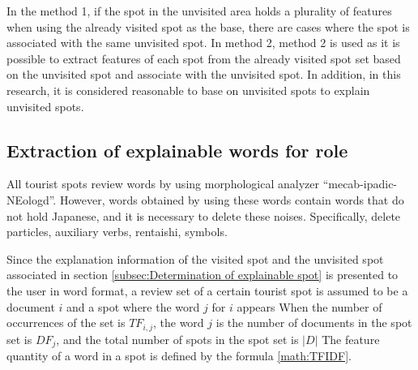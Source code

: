 \documentclass[journal]{IAENGtran}
\begin{document}
In the method 1, if the spot in the unvisited area holds a plurality of features when using the already visited spot as the base, there are cases where the spot is associated with the same unvisited spot.
In method 2, method 2 is used as it is possible to extract features of each spot from the already visited spot set based on the unvisited spot and associate with the unvisited spot.
In addition, in this research, it is considered reasonable to base on unvisited spots to explain unvisited spots.

\subsection{Extraction of explainable words for role}
\label{subsec:Extraction of explainable words for role}
All tourist spots review words by using morphological analyzer ``mecab-ipadic-NEologd''.
However, words obtained by using these words contain words that do not hold Japanese, and it is necessary to delete these noises.
Specifically, delete particles, auxiliary verbs, rentaishi, symbols.

Since the explanation information of the visited spot and the unvisited spot associated in section \ref{subsec:Determination of explainable spot} is presented to the user in word format, a review set of a certain tourist spot is assumed to be a document $i$ and a spot where the word $j$ for $i$ appears When the number of occurrences of the set is $TF_{i,j}$, the word $j$ is the number of documents in the spot set is $DF_{j}$, and the total number of spots in the spot set is $|D|$ The feature quantity of a word in a spot is defined by the formula \ref{math:TFIDF}.
\end{document}
